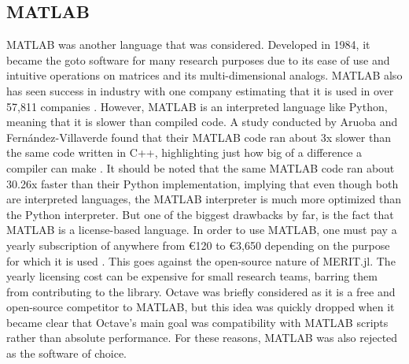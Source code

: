 \subsection{MATLAB}
MATLAB was another language that was considered. Developed in 1984, it became the goto software for many research
purposes due to its ease of use and intuitive operations on matrices and its multi-dimensional analogs. MATLAB also has
seen success in industry with one company estimating that it is used in over 57,811 companies
\cite{CompaniesUsingMATLAB}. However, MATLAB is an interpreted language like Python, meaning that it is slower than
compiled code. A study conducted by Aruoba and Fernández-Villaverde found that their MATLAB code ran about 3x slower
than the same code written in C++, highlighting just how big of a difference a compiler can make
\cite{aruobaComparisonProgrammingLanguages2018}. It should be noted that the same MATLAB code ran about 30.26x faster
than their Python implementation, implying that even though both are interpreted languages, the MATLAB interpreter is
much more optimized than the Python interpreter. But one of the biggest drawbacks by far, is the fact that MATLAB is a
license-based language. In order to use MATLAB, one must pay a yearly subscription of anywhere from €120 to €3,650
depending on the purpose for which it is used \cite{MATLABPricing}. This goes against the open-source nature of
MERIT.jl. The yearly licensing cost can be expensive for small research teams, barring them from contributing to the
library. Octave was briefly considered as it is a free and open-source competitor to MATLAB, but this idea was quickly
dropped when it became clear that Octave's main goal was compatibility with MATLAB scripts rather than absolute
performance. For these reasons, MATLAB was also rejected as the software of choice.

